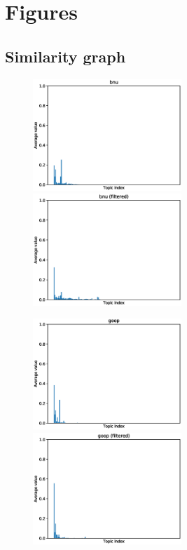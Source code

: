 \chapter{Figures}

\section{Similarity graph} \label{sgfig}
\begin{figure}[ht]
    \centering
    \includegraphics[width=0.5\textwidth]{images/similarity_graphs/non-filtered/bnu.eps}%
    \hfill
    \includegraphics[width=0.5\textwidth]{images/similarity_graphs/filtered/bnu.eps}
\end{figure}

\pagebreak
\begin{figure}[ht]
    \centering
    \includegraphics[width=0.5\textwidth]{images/similarity_graphs/non-filtered/goop.eps}%
    \hfill
    \includegraphics[width=0.5\textwidth]{images/similarity_graphs/filtered/goop.eps}
\end{figure}

